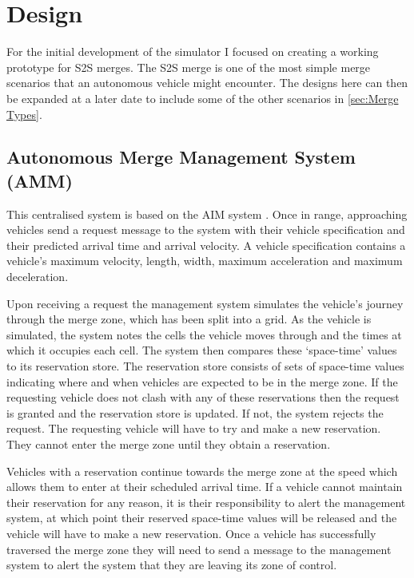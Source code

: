 \chapter{Design}
\label{cha:Design}
For the initial development of the simulator I focused on creating a working prototype for S2S merges. The S2S merge is one of the most simple merge scenarios that an autonomous vehicle might encounter. The designs here can then be expanded at a later date to include some of the other scenarios in \ref{sec:Merge Types}.

\section{Autonomous Merge Management System (AMM)}
\label{sec:Autonomous Merge Management System}
This centralised system is based on the AIM system \citep{Dresner2004}. Once in range, approaching vehicles send a request message to the system with their vehicle specification and their predicted arrival time and arrival velocity. A vehicle specification contains a vehicle's maximum velocity, length, width, maximum acceleration and maximum deceleration.

Upon receiving a request the management system simulates the vehicle's journey through the merge zone, which has been split into a grid. As the vehicle is simulated, the system notes the cells the vehicle moves through and the times at which it occupies each cell. The system then compares these `space-time' values to its reservation store. The reservation store consists of sets of space-time values indicating where and when vehicles are expected to be in the merge zone. If the requesting vehicle does not clash with any of these reservations then the request is granted and the reservation store is updated. If not, the system rejects the request. The requesting vehicle will have to try and make a new reservation. They cannot enter the merge zone until they obtain a reservation.

Vehicles with a reservation continue towards the merge zone at the speed which allows them to enter at their scheduled arrival time. If a vehicle cannot maintain their reservation for any reason, it is their responsibility to alert the management system, at which point their reserved space-time values will be released and the vehicle will have to make a new reservation. Once a vehicle has successfully traversed the merge zone they will need to send a message to the management system to alert the system that they are leaving its zone of control. 


